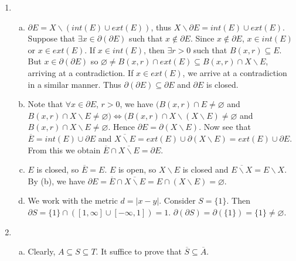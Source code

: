 \documentclass[A4paper,12pt]{article}
\theoremstyle{definition}
\numberwithin{equation}{section}
\begin{document}
\begin{enumerate}[(1)]
        \item
            \begin{enumerate}[(a)]
                \item
                    $\partial E = X \backslash (int(E) \cup ext(E))$, thus $X \backslash \partial E = int(E) \cup ext(E)$.
                    Suppose that $\exists x \in \partial(\partial E)$ such that $x \not \in \partial E$. 
                    Since $x \not \in \partial E$, $x \in int(E)$ or $x \in ext(E)$.
                    If $x \in int(E)$, then $\exists r>0$ such that $B(x, r) \subseteq E$. 
                    But $x \in \partial(\partial E)$ so $\varnothing \neq B(x,r) \cap ext(E) \subseteq B(x, r) \cap X\backslash E$, arriving at a contradiction.
                    If $x \in ext(E)$, we arrive at a contradiction in a similar manner.
                    Thus $\partial(\partial E) \subseteq \partial E$ and $\partial E$ is closed.
                \item
                    Note that $\forall x \in \partial E$, $r>0$, we have $(B(x, r) \cap E \not = \varnothing$ and $B(x, r) \cap X\backslash E \not = \varnothing) \iff (B(x, r) \cap X\backslash (X \backslash E) \not = \varnothing$ and $B(x, r) \cap X \backslash E \not = \varnothing$.
                    Hence $\partial E = \partial (X\backslash E)$.
                    Now see that $\overline{E} = int(E) \cup \partial E$ and $\overline{X\backslash E} = ext(E) \cup \partial (X \backslash E) = ext(E) \cup \partial E$. From this we obtain $\overline{E} \cap \overline{X\backslash E} = \partial E$.
                \item
                    $E$ is closed, so $\overline{E} = E$. $E$ is open, so $X \backslash E$ is closed and $\overline{E\backslash X} = E\backslash X$.
                    By (b), we have $\partial E = \overline{E} \cap \overline{X\backslash E} = E \cap (X\backslash E) = \varnothing$.
                \item
                    We work with the metric $d = |x-y|$.   
                    Consider $S = \{1\}$. Then $\partial S = \{1\} \cap ([1, \infty] \cup [-\infty, 1]) = 1$. $\partial (\partial S) = \partial(\{1\}) = \{1\} \neq \varnothing$.
            \end{enumerate}
        \item
            \begin{enumerate}[(a)]
                \item
                    Clearly, $A \subseteq S \subseteq T$. It suffice to prove that $\overline{S} \subseteq \overline{A}$. 

\end{enumerate}
\end{enumerate}
\end{document}
